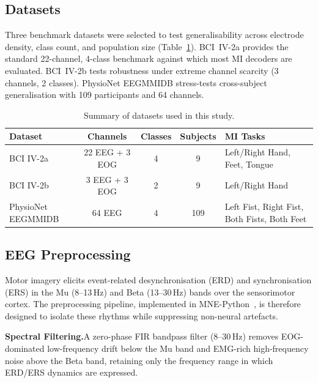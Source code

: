 \documentclass[12pt, a4paper]{article}
\begin{document}
\subsection{Datasets}

Three benchmark datasets were selected to test generalisability across electrode density, class count, and population size (Table~\ref{tab:datasets}). BCI~IV-2a provides the standard 22-channel, 4-class benchmark against which most MI decoders are evaluated. BCI~IV-2b tests robustness under extreme channel scarcity (3 channels, 2 classes). PhysioNet EEGMMIDB stress-tests cross-subject generalisation with 109 participants and 64 channels.

\begin{table}[htbp]
\centering
\caption{Summary of datasets used in this study.}
\label{tab:datasets}
\begin{tabular}{@{} l c c c >{\raggedright\arraybackslash}p{6cm} @{}}
\toprule
\textbf{Dataset} & \textbf{Channels} & \textbf{Classes} & \textbf{Subjects} & \textbf{MI Tasks} \\
\midrule
BCI IV-2a & 22 EEG + 3 EOG & 4 & 9 & Left/Right Hand, Feet, Tongue \\
BCI IV-2b & 3 EEG + 3 EOG & 2 & 9 & Left/Right Hand \\
PhysioNet EEGMMIDB & 64 EEG & 4 & 109 & Left Fist, Right Fist, Both Fists, Both Feet \\
\bottomrule
\end{tabular}
\end{table}

\subsection{EEG Preprocessing}

Motor imagery elicits event-related desynchronisation (ERD) and synchronisation (ERS) in the Mu (8--13\,Hz) and Beta (13--30\,Hz) bands over the sensorimotor cortex. The preprocessing pipeline, implemented in MNE-Python~\cite{gramfort2013mne}, is therefore designed to isolate these rhythms while suppressing non-neural artefacts.

\textbf{Spectral Filtering.}\quad A zero-phase FIR bandpass filter (8--30\,Hz) removes EOG-dominated low-frequency drift below the Mu band and EMG-rich high-frequency noise above the Beta band, retaining only the frequency range in which ERD/ERS dynamics are expressed.
\end{document}
